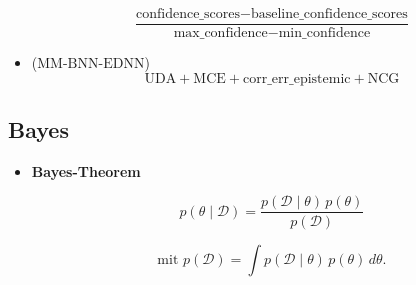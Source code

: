 \begin{formelsammlung}
\begin{mdframed}[style=exercise]
\begin{itemize}[label={},left=0pt]
      {\scriptsize \[
          \frac{\text{confidence\_scores} - \text{baseline\_confidence\_scores}}{\text{max\_confidence} - \text{min\_confidence}}
      \]} \vspace{-1.5em}
      \item {} (\( \text{MM-BNN-EDNN} \)) 
      {\scriptsize \[
          \text{UDA} + \text{MCE} + \text{corr\_err\_epistemic} + \text{NCG}
      \]} \vspace{-1.5em}
    \end{itemize}
  \end{mdframed}

\end{formelsammlung}

\newpage


\begin{formelsammlung}

    \section*{Bayes}
    \begin{mdframed}[style=exercise]
    \begin{itemize}[label={},left=0pt]
        \item \textbf{Bayes-Theorem}
        
        {\scriptsize \[
        p(\theta \mid \mathcal{D}) 
        = \frac{p(\mathcal{D} \mid \theta)\, p(\theta)}{p(\mathcal{D})}
        \]} 
        
        {\scriptsize \[
        \text{mit } p(\mathcal{D}) = \int p(\mathcal{D} \mid \theta)\, p(\theta)\, d\theta.
        \]}
        
    \end{itemize}
    \end{mdframed}


\end{formelsammlung}

